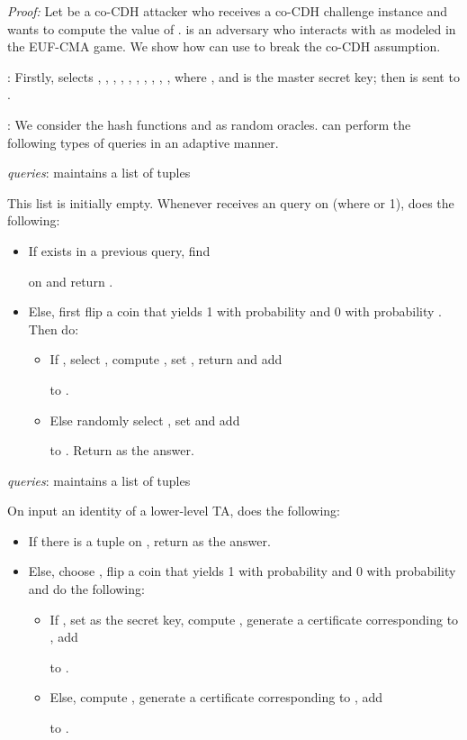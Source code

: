 \documentclass[10pt,journal,compsoc]{IEEEtran}
\begin{document}
\emph{Proof:}
Let  be a co-CDH attacker who receives a co-CDH
challenge instance  and wants to compute the value of
.  is an adversary who interacts with
 as modeled in the EUF-CMA game. We show how  can use  to break the co-CDH assumption.

\smallskip\noindent : Firstly,  selects
, , , ,
, , , , , ,
where , and  is the master secret key; then 
is sent to .

\medskip
\noindent :  We consider the hash functions  and
 as random oracles.  can perform the
following types of queries in an adaptive manner.

\smallskip \noindent  \emph{queries}:  maintains a list
 of tuples

This list is initially empty. Whenever  receives an
 query on  (where  or 1),   does
the following:
\begin{itemize}
  \item If  exists in a previous query,
  find
   
  on  and return .
  \item Else, first flip a coin
 that yields 1 with probability  and 0
with probability . Then do:
      \begin{itemize}
        \item If , select , compute
        , set
        , return 
        and add
         
        to .

        \item Else randomly select ,
         set 
         and add
         
        to . Return  as the answer.
      \end{itemize}
\end{itemize}

\smallskip
{} \emph{queries}: 
maintains a list  of tuples

On input an identity  of a lower-level TA,
 does the following:
\begin{itemize}
  \item If there is a tuple 
  on , return  as the answer.
  \item Else, choose
, flip a coin  that yields 1 with probability  and 0 with
probability  and do the following:
\begin{itemize}
  \item If
, set  as the secret key, compute
, generate a certificate 
corresponding to , add

to .
  \item Else, compute , generate a certificate 
corresponding to , add

to .
\end{itemize}
\end{itemize}
\end{document}
